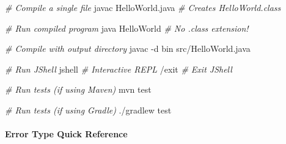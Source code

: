 \documentclass[
  justified,
  openright,
]{tufte-book}
\let\subsection\paragraph
\let\paragraph\paragraph
\newcommand{\CommentTok}[1]{\textcolor{CodeComment}{\textit{#1}}}  %
\newcommand{\CodeTypeTok}[1]{\textcolor{CodeType}{#1}}              %
\newenvironment{Shaded}{%
  \begin{mdframed}[style=TufteCode]%
}{%
  \end{mdframed}%
}
\let\subsection\paragraph
\let\paragraph\paragraph
\begin{document}
\begin{Shaded}
\begin{Highlighting}[]
\CommentTok{\# Compile a single file}
javac HelloWorld.java    \CommentTok{\# Creates HelloWorld.class}
 
\CommentTok{\# Run compiled program}
java HelloWorld          \CommentTok{\# No .class extension!}
 
\CommentTok{\# Compile with output directory}
javac \CodeTypeTok{{-}d} bin src/HelloWorld.java
 
\CommentTok{\# Run JShell}
jshell                   \CommentTok{\# Interactive REPL}
/exit                    \CommentTok{\# Exit JShell}
 
\CommentTok{\# Run tests (if using Maven)}
mvn test
 
\CommentTok{\# Run tests (if using Gradle)}
./gradlew test
\end{Highlighting}
\end{Shaded}

\subsection{Error Type Quick
Reference}\label{error-type-quick-reference-1}
\end{document}
